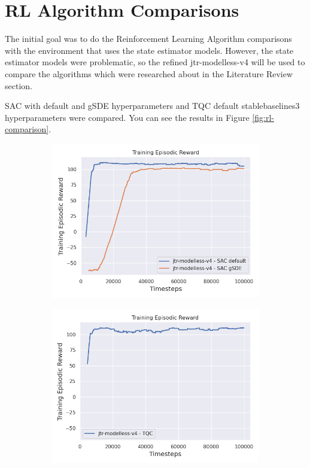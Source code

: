 \documentclass[12pt,twoside]{report}
\begin{document}
\section{RL Algorithm Comparisons}
The initial goal was to do the Reinforcement Learning Algorithm comparisons with the environment that uses the state estimator models. However, the state estimator models were problematic, so the refined jtr-modelless-v4 will be used to compare the algorithms which were researched about in the Literature Review section.

SAC with default and gSDE hyperparameters and TQC default stablebaselines3 hyperparameters were compared. You can see the results in Figure \ref{fig:rl-comparison}.

\begin{figure}[h]
    \centering
    \begin{subfigure}[b]{0.48\textwidth}
        \centering
        \includegraphics[width=\textwidth]{figures/rl-reward-plots/modelless-v4-sac.png}
    \end{subfigure}
    \begin{subfigure}[b]{0.48\textwidth}
        \centering
        \includegraphics[width=\textwidth]{figures/rl-reward-plots/modelless-v4-tqc.png}

\end{subfigure}
\end{figure}
\end{document}
